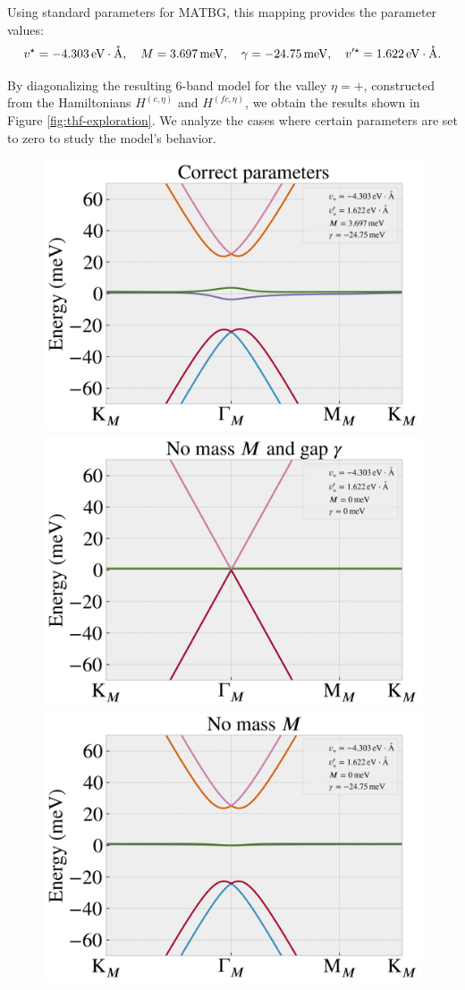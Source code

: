 Using standard parameters for MATBG, this mapping provides the parameter values:
\begin{equation} \label{eq:paramaters_topoheavyfermion}
v^\star = -4.303 \, \text{eV} \cdot \AA, \quad M = 3.697 \, \text{meV}, \quad \gamma = -24.75 \, \text{meV}, \quad v'^\star = 1.622 \, \text{eV} \cdot \AA.
\end{equation}

By diagonalizing the resulting 6-band model for the valley $\eta = +$, constructed from the Hamiltonians $H^{(c,\eta)}$ and $H^{(fc,\eta)}$, we obtain the results shown in Figure \ref{fig:thf-exploration}. We analyze the cases where certain parameters are set to zero to study the model's behavior.

\begin{figure}[H]
\centering
\includegraphics[height=0.35\linewidth]{fig/thf-correct_params.png} \hfill
\includegraphics[height=0.35\linewidth]{fig/thf-no_M_no_gamma.png}
\includegraphics[height=0.35\linewidth]{fig/thf-no_M.png} \hfill

\end{figure}
